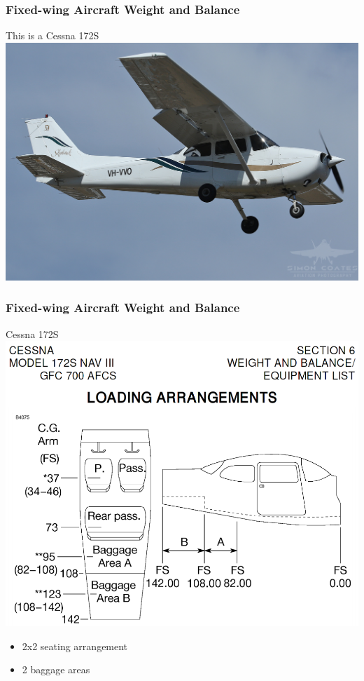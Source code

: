 \begin{frame}
\frametitle{Fixed-wing Aircraft Weight and Balance}
\begin{block}{This is a Cessna 172S}
\includegraphics[height=0.5\textheight]{image/vhvvo.jpg}
\end{block}
\end{frame}

\begin{frame}
\frametitle{Fixed-wing Aircraft Weight and Balance}
\begin{block}{Cessna 172S}
\includegraphics[height=0.5\textheight]{image/c172-loading.png}
\begin{itemize}
\item 2x2 seating arrangement
\item 2 baggage areas
\end{itemize}
\end{block}
\end{frame}

